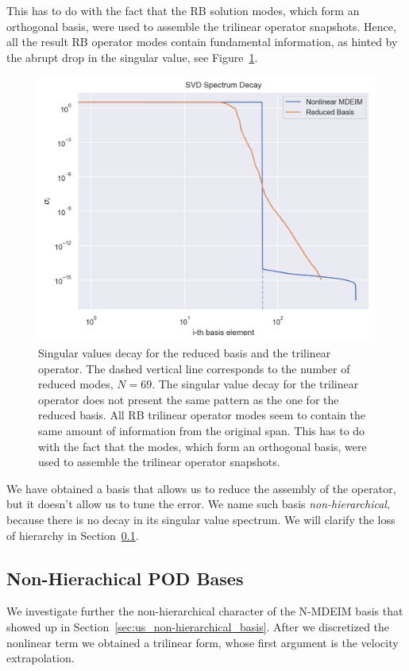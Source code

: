 \documentclass[../../thesis.tex]{subfiles}
\begin{document}
This has to do with the fact that the RB solution modes,
which form an orthogonal basis, were used to assemble the trilinear operator snapshots.
Hence, all the result RB operator modes contain fundamental information,
as hinted by the abrupt drop in the singular value, see Figure~\ref{fig:sigmas_decay}. 
\begin{figure}
    \centering
    \includegraphics[width=1\columnwidth]{research_project/piston/figures/mdeim_certification/sigmas_problem.png}
    \caption{Singular values decay for the reduced basis and the trilinear operator.
    The dashed vertical line corresponds to the number of reduced modes, $N=69$.
    The singular value decay for the trilinear operator does 
    not present the same pattern as the one for the reduced basis.
    All RB trilinear operator modes 
    seem to contain the same amount of information from the original span.
    This has to do with the fact that the modes,
    which form an orthogonal basis, 
    were used to assemble the trilinear operator snapshots.}
    \label{fig:sigmas_decay}
\end{figure}
We have obtained a basis that allows us to reduce the assembly of the operator, 
but it doesn't allow us to tune the error.
We name such basis \textit{non-hierarchical}, 
because there is no decay in its singular value spectrum.
We will clarify the loss of hierarchy in Section~\ref{sec:nonhierachical_pod_bases}.

\newpage
\subsection{Non-Hierachical POD Bases}
\label{sec:nonhierachical_pod_bases}
We investigate further the non-hierarchical character of the N-MDEIM basis
that showed up in Section~\ref{sec:us_non-hierarchical_basis}.
After we discretized the nonlinear term we obtained a trilinear form,
whose first argument is the velocity extrapolation.
\end{document}
